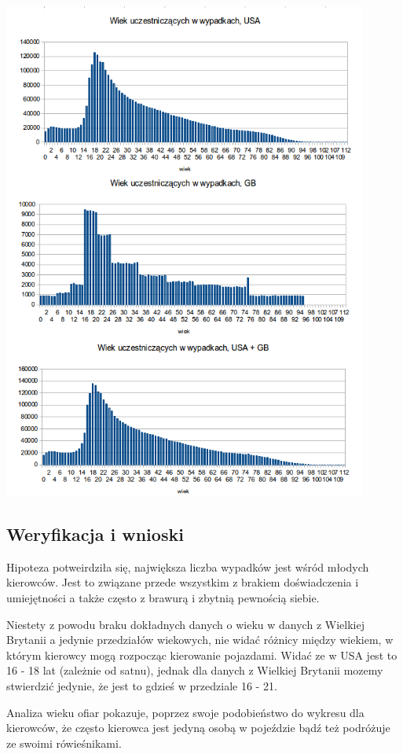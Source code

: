 \includegraphics[width=0.9\textwidth]{images/statistics/person_age.png}

\subsection{Weryfikacja i wnioski}\label{weryfikacja-i-wnioski}

Hipoteza potweirdziła się, największa liczba wypadków jest wśród młodych
kierowców. Jest to związane przede wszystkim z brakiem doświadczenia i
umiejętności a także często z brawurą i zbytnią pewnością siebie.

Niestety z powodu braku dokładnych danych o wieku w danych z Wielkiej
Brytanii a jedynie przedziałów wiekowych, nie widać różnicy między
wiekiem, w którym kierowcy mogą rozpocząc kierowanie pojazdami. Widać ze
w USA jest to 16 - 18 lat (zależnie od satnu), jednak dla danych z
Wielkiej Brytanii mozemy stwierdzić jedynie, że jest to gdzieś w
przedziale 16 - 21.

Analiza wieku ofiar pokazuje, poprzez swoje podobieństwo do wykresu dla
kierowców, że często kierowca jest jedyną osobą w pojeździe bądź też
podróżuje ze swoimi rówieśnikami.

